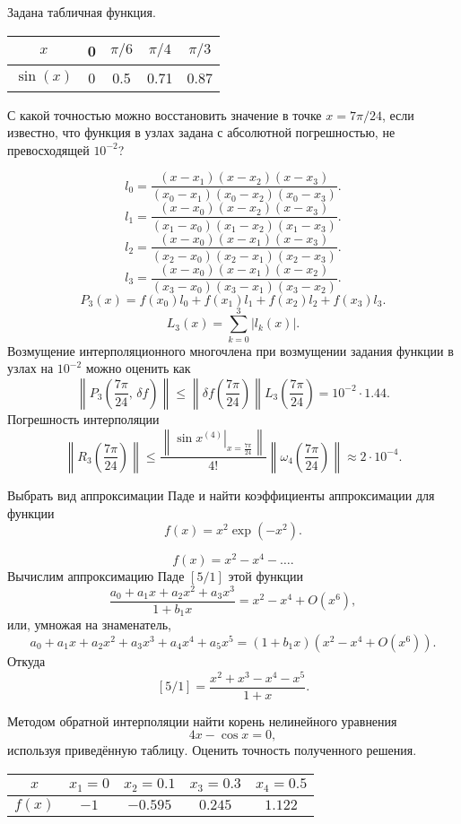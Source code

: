 \documentclass[a4paper]{article}
\begin{document}
\begin{hiProb}[8.13]
Задана табличная функция.
\begin{table}[htpb]
	\centering
	\label{tab:1}
	\begin{tabular}{|c|c|c|c|c|}
	\hline
	$x$&0  &$\pi /6$  &$\pi /4$  &$\pi /3$  \\ \hline
	$\sin (x)$ & 0& 0.5 & 0.71&0.87 \\ \hline
	\end{tabular}
\end{table}
С какой точностью можно восстановить значение в точке $x = 7 \pi /24$,
если известно, что функция в узлах задана с абсолютной погрешностью, не превосходящей $10^{-2}$?
\end{hiProb}
\begin{sol}
\[
	l_0= \frac{(x-x_1)(x-x_2)(x-x_3)}{(x_0-x_1)(x_0-x_2)
	(x_0-x_3)}
.\] 
\[
	l_1=\frac{(x-x_0)(x-x_2)(x-x_3)}{(x_1-x_0)(x_1-x_2)(
	x_1-x_3)}
.\] 
\[
	l_2= \frac{(x-x_0)(x-x_1)(x-x_3)}{(x_2-x_0)(x_2-x_1)
	(x_2-x_3)}
.\] 
\[
	l_3= \frac{(x-x_0)(x-x_1)(x-x_2)}{(x_3-x_0)(x_3-x_1)(x_3-x_2)}
.\] 
\[
	P_3(x)=f(x_0)l_0+f(x_1)l_1+f(x_2)l_2+f(x_3)l_3
.\] 
\[
	L_3(x)= \sum_{k=0}^{3} |l_k(x)|
.\] 
Возмущение интерполяционного многочлена при возмущении задания
функции в узлах на $10^{-2}$ можно оценить как
\[
	\left\| P_3\left(\frac{7\pi}{24},\,\delta f\right)\right\|\le \left\| \delta f\left(\frac{7\pi}{24}\right)\right\|L_3\left(\frac{7\pi}{24}\right)=
	10^{-2}\cdot 1.44
.\] 
Погрешность интерполяции
\[
	\left\| R_3\left( \frac{7\pi}{24} \right) \right\|
	\le \frac{\left\lVert  \left. \sin  x ^{(4)} \right|_{x= \frac{7\pi}{24}}\right\rVert}{4!}\left\| \omega_4\left( \frac{7\pi}{24} \right) \right\|\approx 2 \cdot 10^{-4}
.\] 
\end{sol}
\begin{hiProb}[8.18в]
Выбрать вид аппроксимации Паде и найти коэффициенты аппроксимации
для функции
\[
	f(x)=x^2 \exp \left( -x^2 \right) 
.\] 
\end{hiProb}
\begin{sol}
\[
	f(x) = x^2-x^4-\ldots
.\] 
Вычислим аппроксимацию Паде $[5 /1]$ этой функции
 \[
	 \frac{a_0+a_1 x+a_2 x^2+a_3 x^3}{1+b_1 x}=x^2-x^4 +O(x^6)
,\] 
или, умножая на знаменатель,
\[
	a_0+a_1 x+a_2 x^2+a_3 x^3+a_4 x^4+a_5 x^5=(1+b_1 x)\left(x^2-x^4+O(x^6)\right)
.\] 
Откуда
\[
	[5 /1]= \frac{x^2+x^3-x^4-x^5}{1+x}
.\] 
\end{sol}
\begin{hiProb}[9.1в]
Методом обратной интерполяции найти корень нелинейного
уравнения
\[
4x- \cos x=0
,\] 
используя приведённую таблицу. Оценить точность
полученного решения.
\begin{table}[htpb]
	\centering
	\label{tab:2}
	\begin{tabular}{|c|c|c|c|c|}
		\hline
	$x$ & $x_1=0$  & $x_2=0.1$ & $x_3=0.3$ & $x_4=0.5$  \\
	\hline $f(x)$ & $-1$ & $-0.595$ &$0.245$ & $1.122$ \\ \hline
	\end{tabular}
\end{table}
\end{hiProb}
\end{document}
